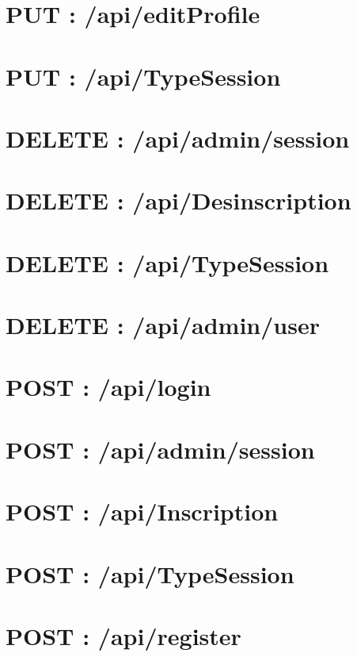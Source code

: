 	
\vspace{\baselineskip}
\section{PUT : /api/editProfile}
	
	
	
\vspace{\baselineskip}
\section{PUT : /api/TypeSession}
	


\newpage
\section{DELETE : /api/admin/session}
	
	
\newpage
\section{DELETE : /api/Desinscription}
	

\newpage
\section{DELETE : /api/TypeSession}
	
	
\newpage
\section{DELETE : /api/admin/user}
	

\vspace{\baselineskip}
\section{POST : /api/login}
	
	
\newpage
\section{POST : /api/admin/session}
	
	
	
\vspace{\baselineskip}
\section{POST : /api/Inscription}
	
	
	
\vspace{\baselineskip}
\section{POST : /api/TypeSession}
	
	
\newpage
\section{POST : /api/register}
	
